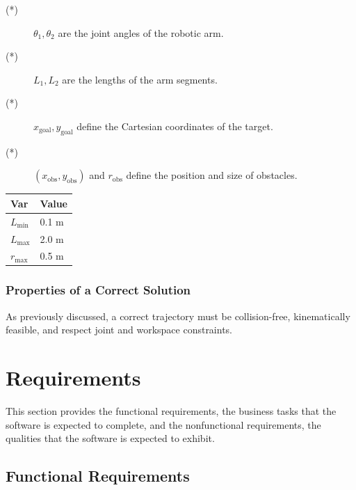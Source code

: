 \documentclass[12pt]{article}
\begin{document}
\noindent 
\begin{description}
\item[(*)] $\theta_1, \theta_2$ are the joint angles of the robotic arm.
\item[(*)] $L_1, L_2$ are the lengths of the arm segments.
\item[(*)] $x_{\text{goal}}, y_{\text{goal}}$ define the Cartesian coordinates of the target.
\item[(*)] $(x_{\text{obs}}, y_{\text{obs}})$ and $r_{\text{obs}}$ define the position and size of obstacles.
\end{description}

\begin{table}[!h]
\caption{Specification Parameter Values for 2D-RAPP} \label{TblSpecParams}
\renewcommand{\arraystretch}{1.2}
\noindent \begin{longtable*}{l l} 
  \toprule
  \textbf{Var} & \textbf{Value} \\
  \midrule 
  $L_\text{min}$ & 0.1 \si{\metre}\\
  $L_\text{max}$ & 2.0 \si{\metre}\\
  $r_{\text{max}}$ & 0.5 \si{\metre}\\
  \bottomrule
\end{longtable*}
\end{table}


\subsubsection{Properties of a Correct Solution} \label{sec_CorrectSolution}

As previously discussed, a correct trajectory must be collision-free, kinematically feasible, and respect joint and workspace constraints.



\section{Requirements}

This section provides the functional requirements, the business tasks that the
software is expected to complete, and the nonfunctional requirements, the
qualities that the software is expected to exhibit.

\subsection{Functional Requirements}
\end{document}
